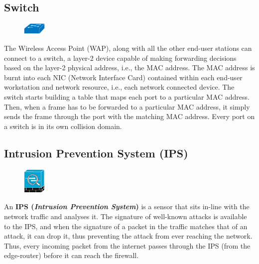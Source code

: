 \subsection{Switch}
\begin{figure}
	\centering
	\vspace{-10pt}
	\includegraphics[width=0.1\textwidth]{"Mod1/chapters/1.2.b Network Icons/1.2.b.5 Switch"}
	\vspace{-10pt}
\end{figure}
The Wireless Access Point (WAP), along with all the other end-user stations can connect to a switch, a layer-2 device capable of making forwarding decisions based on the layer-2 physical address, i.e., the MAC address. The MAC address is burnt into each NIC (Network Interface Card) contained within each end-user workstation and network resource, i.e., each network connected device. The switch starts building a table that maps each port to a particular MAC address. Then, when a frame has to be forwarded to a particular MAC address, it simply sends the frame through the port with the matching MAC address. Every port on a switch is in its own collision domain. 

\subsection{Intrusion Prevention System (IPS)}
\begin{figure}
	\centering
	\vspace{-10pt}
	\includegraphics[width=0.1\textwidth]{"Mod1/chapters/1.2.b Network Icons/1.2.b.6 IPS"}
	\vspace{-10pt}
\end{figure}
An \textbf{IPS (\textit{Intrusion Prevention System})} is a sensor that sits in-line with the network traffic and analyses it. The signature of well-known attacks is available to the IPS, and when the signature of a packet in the traffic matches that of an attack, it can drop it, thus preventing the attack from ever reaching the network. Thus, every incoming packet from the internet passes through the IPS (from the edge-router) before it can reach the firewall. 

